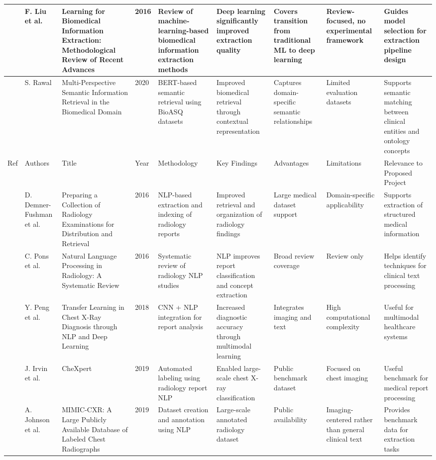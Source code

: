 \begin{landscape}
\begin{singlespace}
\begin{longtable}{|p{0.8cm}|p{1.8cm}|p{3.2cm}|p{0.8cm}|p{3.6cm}|p{3.6cm}|p{2.5cm}|p{2.5cm}|p{3.2cm}|}
\hline
\cite{ref24} & F. Liu et al. & Learning for Biomedical Information Extraction: Methodological Review of Recent Advances & 2016 & Review of machine-learning-based biomedical information extraction methods & Deep learning significantly improved extraction quality & Covers transition from traditional ML to deep learning & Review-focused, no experimental framework & Guides model selection for extraction pipeline design \\
\hline
\cite{ref25} & S. Rawal & Multi-Perspective Semantic Information Retrieval in the Biomedical Domain & 2020 & BERT-based semantic retrieval using BioASQ datasets & Improved biomedical retrieval through contextual representation & Captures domain-specific semantic relationships & Limited evaluation datasets & Supports semantic matching between clinical entities and ontology concepts \\
\hline
Ref & Authors & Title & Year & Methodology & Key Findings & Advantages & Limitations & Relevance to Proposed Project \\
\hline
\cite{ref26} & D. Demner-Fushman et al. & Preparing a Collection of Radiology Examinations for Distribution and Retrieval & 2016 & NLP-based extraction and indexing of radiology reports & Improved retrieval and organization of radiology findings & Large medical dataset support & Domain-specific applicability & Supports extraction of structured medical information \\
\hline
\cite{ref27} & C. Pons et al. & Natural Language Processing in Radiology: A Systematic Review & 2016 & Systematic review of radiology NLP studies & NLP improves report classification and concept extraction & Broad review coverage & Review only & Helps identify techniques for clinical text processing \\
\hline
\cite{ref28} & Y. Peng et al. & Transfer Learning in Chest X-Ray Diagnosis through NLP and Deep Learning & 2018 & CNN + NLP integration for report analysis & Increased diagnostic accuracy through multimodal learning & Integrates imaging and text & High computational complexity & Useful for multimodal healthcare systems \\
\hline
\cite{ref29} & J. Irvin et al. & CheXpert & 2019 & Automated labeling using radiology report NLP & Enabled large-scale chest X-ray classification & Public benchmark dataset & Focused on chest imaging & Useful benchmark for medical report processing \\
\hline
\cite{ref30} & A. Johnson et al. & MIMIC-CXR: A Large Publicly Available Database of Labeled Chest Radiographs & 2019 & Dataset creation and annotation using NLP & Large-scale annotated radiology dataset & Public availability & Imaging-centered rather than general clinical text & Provides benchmark data for extraction tasks \\

\end{longtable}
\end{singlespace}
\end{landscape}
